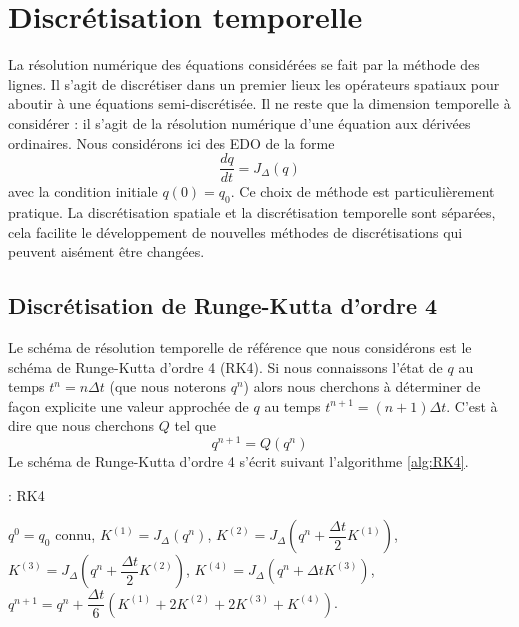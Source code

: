 \section{Discrétisation temporelle}

La résolution numérique des équations considérées se fait par la méthode des lignes. Il s'agit de discrétiser dans un premier lieux les opérateurs spatiaux pour aboutir à une équations semi-discrétisée. Il ne reste que la dimension temporelle à considérer : il s'agit de la résolution numérique d'une équation aux dérivées ordinaires. Nous considérons ici des EDO de la forme
\begin{equation}
\dfrac{d q}{dt} = J_{\Delta} (q)
\label{eq:edo}
\end{equation}
avec la condition initiale $q(0)=q_0$. 
Ce choix de méthode est particulièrement pratique. La discrétisation spatiale et la discrétisation temporelle sont séparées, cela facilite le développement de nouvelles méthodes de discrétisations qui peuvent aisément être changées.

\subsection{Discrétisation de Runge-Kutta d'ordre 4}

Le schéma de résolution temporelle de référence que nous considérons est le schéma de Runge-Kutta d'ordre 4 (RK4). Si nous connaissons l'état de $q$ au temps $t^n = n \Delta t$ (que nous noterons $q^n$) alors nous cherchons à déterminer de façon explicite une valeur approchée de $q$ au temps $t^{n+1} = (n+1) \Delta t$. C'est à dire que nous cherchons $Q$ tel que
\begin{equation}
q^{n+1} = Q(q^n)
\end{equation}
Le schéma de Runge-Kutta d'ordre 4 s'écrit suivant l'algorithme \ref{alg:RK4}.

\begin{center}
\begin{minipage}[H]{12cm}
  \begin{algorithm}[H]
    \caption{: RK4}\label{alg:RK4}
    \begin{algorithmic}[1]
    \State $q^0 = q_0$ connu,
             \State  $K^{(1)} = J_{\Delta} \left( q^n \right)$,
             \State  $K^{(2)} = J_{\Delta} \left( q^n + \dfrac{\Delta t}{2} K^{(1)}\right)$,
             \State  $K^{(3)} = J_{\Delta} \left( q^n + \dfrac{\Delta t}{2} K^{(2)}\right)$,
             \State  $K^{(4)} = J_{\Delta} \left( q^n + \Delta t K^{(3)}\right)$,  
             \State  $q^{n+1} = q^n  + \dfrac{\Delta t}{6} \left( K^{(1)} + 2 K^{(2)} + 2 K^{(3)} + K^{(4)} \right)$.
            \EndFor
    \end{algorithmic}
    \end{algorithm}
\end{minipage}
\end{center}


